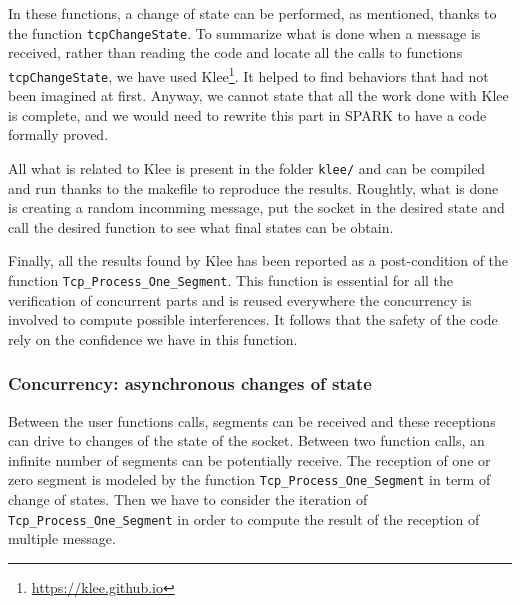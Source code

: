 \documentclass[a4paper, 10pt]{article}
\begin{document}
    In these functions, a change of state can be performed, as mentioned, thanks to the function
    \texttt{tcpChangeState}. To summarize what is done when a message is received, rather than
    reading the code and locate all the calls to functions \texttt{tcpChangeState}, we have used
    Klee\footnote{\url{https://klee.github.io}}. It helped to find behaviors that had not been
    imagined at first. Anyway, we cannot state that all the work done with Klee is complete, and
    we would need to rewrite this part in SPARK to have a code formally proved.

    All what is related to Klee is present in the folder \texttt{klee/} and can be compiled and run
    thanks to the makefile to reproduce the results. Roughtly, what is done is creating a random
    incomming message, put the socket in the desired state and call the desired function to see what
    final states can be obtain.

    Finally, all the results found by Klee has been reported as a post-condition of the function \lstinline[language=Ada]{Tcp_Process_One_Segment}.
    This function is essential for all the verification of concurrent parts and is reused everywhere
    the concurrency is involved to compute possible interferences. It follows that the safety of the code rely on the
    confidence we have in this function.

    \subsubsection{Concurrency: asynchronous changes of state}
    \label{section:asynchronous}

    Between the user functions calls, segments can be received and these receptions can drive to
    changes of the state of the socket. Between two function calls, an infinite number of segments
    can be potentially receive. The reception of one or zero segment is modeled by the function
    \lstinline[language=Ada]{Tcp_Process_One_Segment} in term of change of states. Then we have
    to consider the iteration of \lstinline[language=Ada]{Tcp_Process_One_Segment} in order to
    compute the result of the reception of multiple message.
\end{document}
